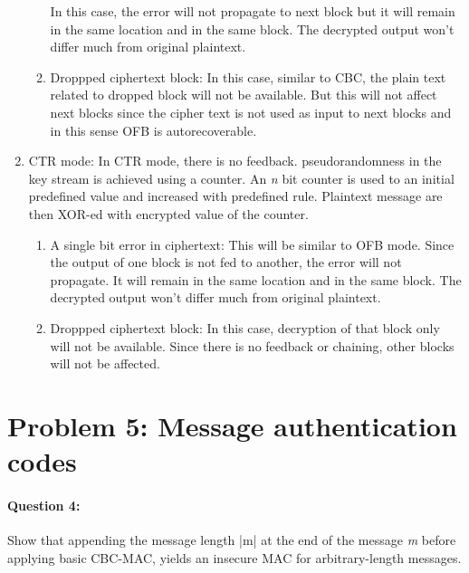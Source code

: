 \documentclass{article}
\begin{document}
\begin{enumerate}
\begin{enumerate}
                In this case, the error will not propagate to next block but it will remain in the same location and in the same block. The decrypted output won't differ much from original plaintext.
                \item Droppped ciphertext block: \newline
                In this case, similar to CBC, the plain text related to dropped block will not be available. But this will not affect next blocks since the cipher text is not used as input to next blocks and in this sense OFB is autorecoverable.
            \end{enumerate}
        \item CTR mode: In CTR mode, there is no feedback. pseudorandomness in the key stream is achieved using a counter. An \emph{n} bit counter is used to an initial predefined value and increased with predefined rule. Plaintext message are then XOR-ed with encrypted value of the counter.
            \begin{enumerate}
                \item A single bit error in ciphertext:\newline
                    This will be similar to OFB mode. Since the output of one block is not fed to another, the error will not propagate. It will remain in the same location and in the same block. The decrypted output won't differ much from original plaintext.
                \item Droppped ciphertext block: \newline
                In this case, decryption of that block only will not be available. Since there is no feedback or chaining, other blocks will not be affected.            
            \end{enumerate}
    \end{enumerate}

\section{Problem 5: Message authentication codes}
    \paragraph{Question 4:}Show that appending the message length |m| at the end of the message \emph{m} before applying basic CBC-MAC, yields an insecure MAC for arbitrary-length messages.
\end{document}

